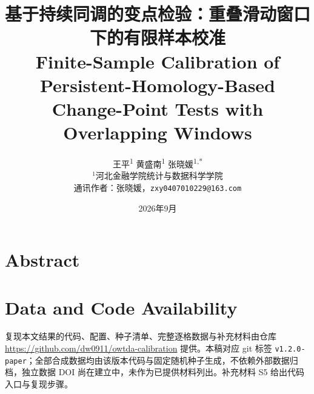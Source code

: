 \documentclass[UTF8,zihao=-4]{ctexart}
\title{基于持续同调的变点检验：重叠滑动窗口下的有限样本校准\\\large Finite-Sample Calibration of Persistent-Homology-Based Change-Point Tests with Overlapping Windows}
\author{
  王平\textsuperscript{1}\quad
  黄盛南\textsuperscript{1}\quad
  张晓媛\textsuperscript{1,*}\\[2mm]
  \small $^1$河北金融学院统计与数据科学学院\\[1mm]
  \small 通讯作者：张晓媛，\texttt{zxy0407010229@163.com}
}
\date{2026年9月}
\theoremstyle{remark}
\begin{document}
\maketitle

\begin{abstract}

\end{abstract}

\section*{Abstract}












\section*{Data and Code Availability}
复现本文结果的代码、配置、种子清单、完整逐格数据与补充材料由仓库 \url{https://github.com/dw0911/owtda-calibration} 提供。本稿对应 git 标签 \texttt{v1.2.0-paper}；全部合成数据均由该版本代码与固定随机种子生成，不依赖外部数据归档，独立数据 DOI 尚在建立中，未作为已提供材料列出。补充材料 S5 给出代码入口与复现步骤。



\end{document}
